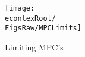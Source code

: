 \begin{figure}
\centerline{\texttt{[image: \\econtexRoot/\\FigsRaw/MPCLimits]}}
\caption{Limiting MPC's}
\label{fig:mpclimits}
\end{figure}
